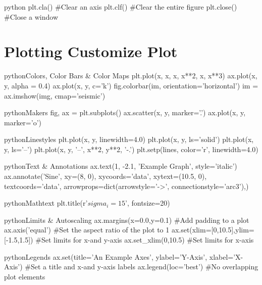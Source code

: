 \begin{codebox}{python}{}
plt.cla()  #Clear an axis
plt.clf()  #Clear the entire figure
plt.close()  #Close a window
\end{codebox}


\section{Plotting Customize Plot}

\begin{codebox}{python}{Colors{,} Color Bars \& Color Maps}
plt.plot(x, x, x, x**2, x, x**3)
ax.plot(x, y, alpha = 0.4)
ax.plot(x, y, c='k')
fig.colorbar(im, orientation='horizontal')
im = ax.imshow(img, cmap='seismic')
\end{codebox}

\begin{codebox}{python}{Makers}
fig, ax = plt.subplots()
ax.scatter(x, y, marker='.')
ax.plot(x, y, marker='o')
\end{codebox}

\begin{codebox}{python}{Linestyles}
plt.plot(x, y, linewidth=4.0)
plt.plot(x, y, ls='solid')
plt.plot(x, y, ls='--')
plt.plot(x, y, '--', x**2, y**2, '-.')
plt.setp(lines, color='r', linewidth=4.0)
\end{codebox}

\begin{codebox}{python}{Text \& Annotations}
ax.text(1, -2.1, 'Example Graph', style='italic')
ax.annotate('Sine', xy=(8, 0), xycoords='data', xytext=(10.5, 0), textcoords='data', arrowprops=dict(arrowstyle='->', connectionstyle='arc3'),)
\end{codebox}

\begin{codebox}{python}{Mathtext}
plt.title(r'$sigma_i=15$', fontsize=20)
\end{codebox}

\begin{codebox}{python}{Limits \& Autoscaling}
ax.margins(x=0.0,y=0.1)  #Add padding to a plot
ax.axis('equal')  #Set the aspect ratio of the plot to 1
ax.set(xlim=[0,10.5],ylim=[-1.5,1.5])  #Set limits for x-and y-axis
ax.set_xlim(0,10.5)  #Set limits for x-axis
\end{codebox}

\begin{codebox}{python}{Legends}
ax.set(title='An Example Axes', ylabel='Y-Axis', xlabel='X-Axis')  #Set a title and x-and y-axis labels
ax.legend(loc='best')  #No overlapping plot elements
\end{codebox}

